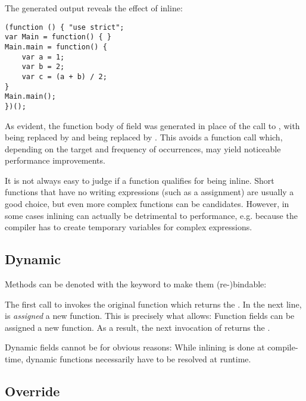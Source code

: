 \documentclass{haxe}
\begin{document}

The generated  output reveals the effect of inline:

\begin{lstlisting}
(function () { "use strict";
var Main = function() { }
Main.main = function() {
	var a = 1;
	var b = 2;
	var c = (a + b) / 2;
}
Main.main();
})();
\end{lstlisting}

As evident, the function body  of field  was generated in place of the call to , with  being replaced by  and  being replaced by . This avoids a function call which, depending on the target and frequency of occurrences, may yield noticeable performance improvements.

It is not always easy to judge if a function qualifies for being inline. Short functions that have no writing expressions (such as a \expr{=} assignment) are usually a good choice, but even more complex functions can be candidates. However, in some cases inlining can actually be detrimental to performance, e.g. because the compiler has to create temporary variables for complex expressions.

\subsection{Dynamic}
\label{class-field-dynamic}

Methods can be denoted with the  keyword to make them (re-)bindable:


The first call to  invokes the original function which returns the  . In the next line,  is \emph{assigned} a new function. This is precisely what  allows: Function fields can be assigned a new function. As a result, the next invocation of  returns the  .

Dynamic fields cannot be  for obvious reasons: While inlining is done at compile-time, dynamic functions necessarily have to be resolved at runtime.


\subsection{Override}
\label{class-field-override}
\end{document}
